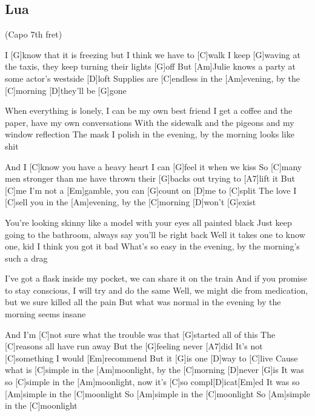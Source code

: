 \subsection*{Lua   }
\begin{guitar}
(Capo 7th fret)


I [G]know that it is freezing but I think we have to [C]walk
I keep [G]waving at the taxis, they keep turning their lights [G]off
But [Am]Julie knows a party at some actor's westside [D]loft
Supplies are [C]endless in the [Am]evening, by the [C]morning [D]they'll be [G]gone

When everything is lonely, I can be my own best friend
I get a coffee and the paper, have my own conversations
With the sidewalk and the pigeons and my window reflection
The mask I polish in the evening, by the morning looks like shit

And I [C]know you have a heavy heart
I can [G]feel it when we kiss
So [C]many men stronger than me
have thrown their [G]backs out trying to [A7]lift it
But [C]me I'm not a [Em]gamble, you can [G]count on [D]me to [C]split
The love I [C]sell you in the [Am]evening, by the [C]morning [D]won't [G]exist

You're looking skinny like a model with your eyes all painted black
Just keep going to the bathroom, always say you'll be right back
Well it takes one to know one, kid I think you got it bad
What's so easy in the evening, by the morning's such a drag

I've got a flask inside my pocket, we can share it on the train
And if you promise to stay conscious, I will try and do the same
Well, we might die from medication, but we sure killed all the pain
But what was normal in the evening by the morning seems insane

And I'm [C]not sure what the trouble was
that [G]started all of this
The [C]reasons all have run away
But the [G]feeling never [A7]did
It's not [C]something I would [Em]recommend
But it [G]is one [D]way to [C]live
Cause what is [C]simple in the [Am]moonlight, by the [C]morning [D]never [G]is
It was so [C]simple in the [Am]moonlight, now it's [C]so compl[D]icat[Em]ed
It was so [Am]simple in the [C]moonlight
So [Am]simple in the [C]moonlight
So [Am]simple in the [C]moonlight
\end{guitar}
